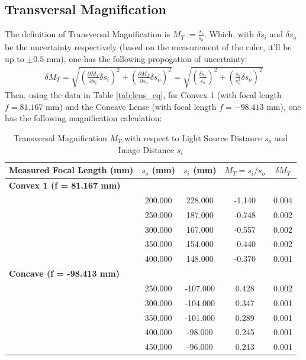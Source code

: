 \documentclass{article}
\begin{document}
\subsection{Transversal Magnification}
The definition of Transversal Magnification is $M_T := \frac{s_i}{s_o}$. Which, with $\delta s_i$ and $\delta s_o$ be the uncertainty respectively (based on the measurement of the ruler, it'll be up to $\pm 0.5$ mm), one has the following propogation of uncertainty:
\begin{align}
    \delta M_T = \sqrt{\left(\frac{\partial M_T}{\partial s_i}\delta s_i\right)^2 + \left(\frac{\partial M_T}{\partial s_o}\delta s_o\right)^2} = \sqrt{\left(\frac{\delta s_i}{s_o}\right)^2+\left(\frac{s_i}{s_o^2}\delta s_o\right)^2}
\end{align}
Then, using the data in Table \ref{tab:lens_eq}, for Convex 1 (with focal length $f=81.167$ mm) and the Concave Lense (with focal length $f=-98.413$ mm), one has the following magnification calculation:
\begin{table}[h!]
\centering
\begin{tabular}{l||cc|cc}
\hline
\textbf{Measured Focal Length (mm)} & \textbf{$s_o$ (mm)} & \textbf{$s_i$ (mm)} & \textbf{$M_T = s_i/s_o$} & \textbf{$\delta M_T$} \\
\hline
\multicolumn{5}{l}{\textbf{Convex 1 (f = 81.167 mm)}} \\
 & 200.000 & 228.000 & -1.140 & 0.004 \\
 & 250.000 & 187.000 & -0.748 & 0.002 \\
 & 300.000 & 167.000 & -0.557 & 0.002 \\
 & 350.000 & 154.000 & -0.440 & 0.002 \\
 & 400.000 & 148.000 & -0.370 & 0.001 \\
\hline
\multicolumn{5}{l}{\textbf{Concave (f = -98.413 mm)}} \\
 & 250.000 & -107.000 & 0.428 & 0.002 \\
 & 300.000 & -104.000 & 0.347 & 0.001 \\
 & 350.000 & -101.000 & 0.289 & 0.001 \\
 & 400.000 & -98.000 & 0.245 & 0.001 \\
 & 450.000 & -96.000 & 0.213 & 0.001 \\
\hline
\end{tabular}
\caption{Transversal Magnification $M_T$ with respect to Light Source Distance $s_o$ and Image Distance $s_i$}
\label{tab:trans_magnify}
\end{table}
\end{document}
